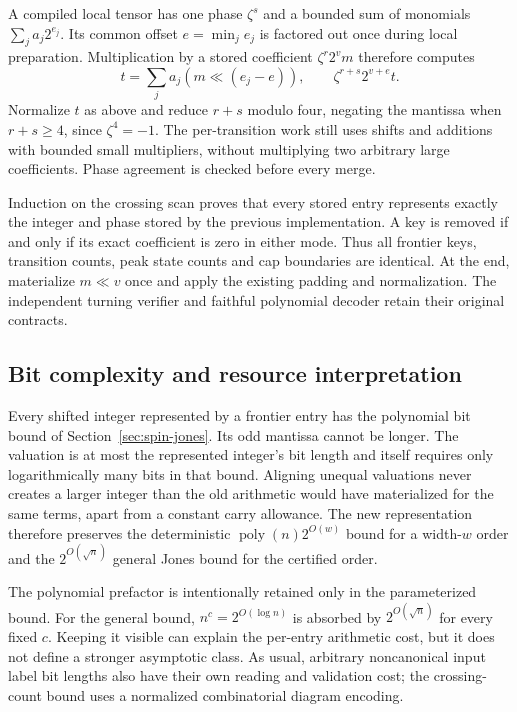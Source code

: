 A compiled local tensor has one phase $\zeta^s$ and a bounded sum of
monomials $\sum_j a_j2^{e_j}$. Its common offset $e=\min_j e_j$ is factored
out once during local preparation. Multiplication by a stored coefficient
$\zeta^r2^vm$ therefore computes
\[
 t=\sum_j a_j(m\ll(e_j-e)),\qquad
 \zeta^{r+s}2^{v+e}t.
\]
Normalize $t$ as above and reduce $r+s$ modulo four, negating the mantissa
when $r+s\ge4$, since $\zeta^4=-1$. The per-transition work still uses
shifts and additions with bounded small multipliers, without multiplying two
arbitrary large coefficients. Phase agreement is checked before every merge.

Induction on the crossing scan proves that every stored entry represents
exactly the integer and phase stored by the previous implementation. A key
is removed if and only if its exact coefficient is zero in either mode.
Thus all frontier keys, transition counts, peak state counts and cap boundaries
are identical. At the end, materialize $m\ll v$ once and apply the existing
padding and normalization. The independent turning verifier and faithful
polynomial decoder retain their original contracts.

\subsection{Bit complexity and resource interpretation}
Every shifted integer represented by a frontier entry has the polynomial
bit bound of Section~\ref{sec:spin-jones}. Its odd mantissa cannot be longer.
The valuation is at most the represented integer's bit length and itself
requires only logarithmically many bits in that bound. Aligning unequal
valuations never creates a larger integer than the old arithmetic would
have materialized for the same terms, apart from a constant carry allowance.
The new representation therefore preserves the deterministic
$\operatorname{poly}(n)2^{O(w)}$ bound for a width-$w$ order and the
$2^{O(\sqrt n)}$ general Jones bound for the certified order.

The polynomial prefactor is intentionally retained only in the parameterized
bound. For the general bound, $n^c=2^{O(\log n)}$ is absorbed by
$2^{O(\sqrt n)}$ for every fixed $c$. Keeping it visible can explain the
per-entry arithmetic cost, but it does not define a stronger asymptotic class.
As usual, arbitrary noncanonical input label bit lengths also have their own
reading and validation cost; the crossing-count bound uses a normalized
combinatorial diagram encoding.

